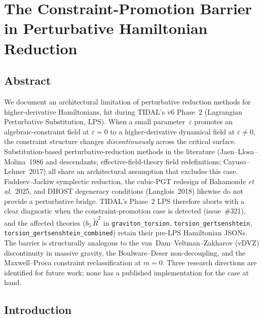 %

\section{The Constraint-Promotion Barrier in Perturbative Hamiltonian Reduction}
\label{sec:pr-constraint-barrier}

\subsection{Abstract}
\label{sec:pr-cb-abstract}

We document an architectural limitation of perturbative reduction methods for
higher-derivative Hamiltonians, hit during TIDAL's v6 Phase~2 (Lagrangian
Perturbative Substitution, LPS).  When a small parameter~$\varepsilon$ promotes
an algebraic-constraint field at $\varepsilon = 0$ to a higher-derivative dynamical
field at $\varepsilon \ne 0$, the constraint structure changes \emph{discontinuously}
across the critical surface.  Substitution-based perturbative-reduction methods
in the literature (Jaen--Llosa--Molina~1986 and descendants; effective-field-theory
field redefinitions; Cayuso--Lehner~2017) all share an architectural assumption
that excludes this case.  Faddeev--Jackiw symplectic reduction, the cubic-PGT
redesign of Bahamonde \emph{et al.}~2025, and DHOST degeneracy conditions
(Langlois~2018) likewise do not provide a perturbative bridge.  TIDAL's
Phase~2 LPS therefore aborts with a clear diagnostic when the constraint-promotion
case is detected (issue~\#321), and the affected theories
($b_5\,\tilde{R}^2$ in \texttt{graviton\_torsion}, \texttt{torsion\_gertsenshtein},
\texttt{torsion\_gertsenshtein\_combined}) retain their pre-LPS Hamiltonian
JSONs.  The barrier is structurally analogous to the van~Dam--Veltman--Zakharov
(vDVZ) discontinuity in massive gravity, the Boulware--Deser non-decoupling, and
the Maxwell--Proca constraint reclassification at $m = 0$.  Three research
directions are identified for future work; none has a published implementation
for the case at hand.

\subsection{Introduction}
\label{sec:pr-cb-intro}

